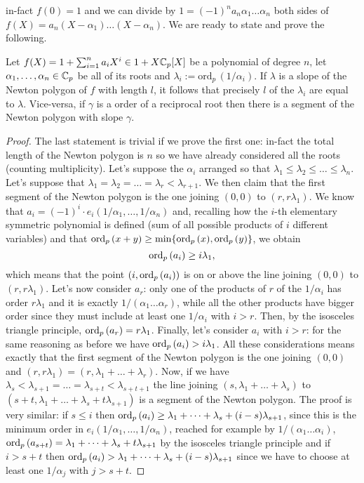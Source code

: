 		in-fact $f(0) = 1$ and we can divide by $1 = (-1)^na_n\alpha_1\dots\alpha_n$ both sides of $f(X) = a_n(X - \alpha_1)\dots(X - \alpha_n)$.\newline
		We are ready to state and prove the following.
		\begin{thm}
			\label{thm:newton-polygon-polinomial-zeroes}
			Let $f(X) = 1 + \sum_{i=1}^n a_iX^i \in 1 + X\mathbb{C}_p[X]$ be a polynomial of degree $n$, let $\alpha_1, \dots, \alpha_n \in \mathbb{C}_p$ be all of its roots and $\lambda_i := \mathrm{ord}_p\,\left(1/\alpha_i\right)$. If $\lambda$ is a slope of the Newton polygon of $f$ with length $l$, it follows that precisely $l$ of the $\lambda_i$ are equal to $\lambda$. Vice-versa, if $\gamma$ is a \padic order of a reciprocal root then there is a segment of the Newton polygon with slope $\gamma$.
		\end{thm}
		\begin{proof}
			The last statement is trivial if we prove the first one: in-fact the total length of the Newton polygon is $n$ so we have already considered all the roots (counting multiplicity).\newline
			Let's suppose the $\alpha_i$ arranged so that $\lambda_1 \leq \lambda_2 \leq \dots \leq \lambda_n$. Let's suppose that $\lambda_1 = \lambda_2 = \dots = \lambda_r < \lambda_{r+1}$. We then claim that the first segment of the Newton polygon is the one joining $(0,0)$ to $(r, r\lambda_1)$. We know that $a_i = (-1)^i \cdot e_i\left(1/\alpha_1, \dots, 1/\alpha_n\right)$ and, recalling how the $i$-th elementary symmetric polynomial is defined (sum of all possible products of $i$ different variables) and that $\textrm{ord}_p\,(x + y) \geq \min\{\textrm{ord}_p\,(x),\textrm{ord}_p\,(y)\}$, we obtain 
			\[
			\textrm{ord}_p\,(a_i) \geq i\lambda_1,
			\]
			which means that the point $(i, \textrm{ord}_p\,(a_i))$ is on or above the line joining $(0,0)$ to $(r, r\lambda_1)$. Let's now consider $a_r$: only one of the products of $r$ of the $1/\alpha_i$ has \padic order $r\lambda_1$ and it is exactly $1/(\alpha_1 \dots \alpha_r)$, while all the other products have bigger \padic order since they must include at least one $1/\alpha_i$ with $i > r$. Then, by the isosceles triangle principle, $\textrm{ord}_p\,(a_r) = r\lambda_1$. Finally, let's consider $a_i$ with $i > r$: for the same reasoning as before we have $\textrm{ord}_p\,(a_i) > i\lambda_1$. \newline
			All these considerations means exactly that the first segment of the Newton polygon is the one joining $(0,0)$ and $(r, r\lambda_1) = (r, \lambda_1 + \dots + \lambda_r)$. Now, if we have $\lambda_s < \lambda_{s+1} = \dots = \lambda_{s+t} < \lambda_{s+t+1}$ the line joining $(s, \lambda_1 + \dots + \lambda_s)$ to $(s+t, \lambda_1 + \dots + \lambda_s + t\lambda_{s+1})$ is a segment of the Newton polygon. The proof is very similar: if $s \leq i$ then $\textrm{ord}_p\,(a_i) \geq \lambda_1 + \dots + \lambda_s + (i-s)\lambda_{s+1}$, since this is the minimum \padic order in $e_i\left(1/\alpha_1, \dots, 1/\alpha_n\right)$, reached for example by $1/(\alpha_1\dots\alpha_i)$, $\textrm{ord}_p\,(a_{s+t}) = \lambda_1 + \dots + \lambda_s + t\lambda_{s+1}$ by the isosceles triangle principle and if $i > s+t$ then $\textrm{ord}_p\,(a_i) > \lambda_1 + \dots +\lambda_s + (i - s)\lambda_{s+1}$ since we have to choose at least one $1/\alpha_j$ with $j > s+t$.
		\end{proof}
